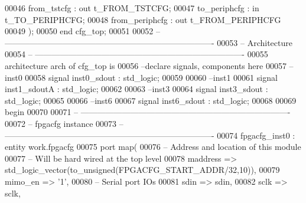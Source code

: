 \begin{DoxyCode}
00046       \textcolor{vhdlchar}{from_tstcfg}          \textcolor{vhdlchar}{:} \textcolor{keywordflow}{out} \textcolor{vhdlchar}{t_FROM_TSTCFG};
00047       \textcolor{vhdlchar}{to_periphcfg}         \textcolor{vhdlchar}{:} \textcolor{keywordflow}{in}  \textcolor{vhdlchar}{t_TO_PERIPHCFG};
00048       \textcolor{vhdlchar}{from_periphcfg}       \textcolor{vhdlchar}{:} \textcolor{keywordflow}{out} \textcolor{vhdlchar}{t_FROM_PERIPHCFG}
00049    \textcolor{vhdlchar}{)};
00050 \textcolor{keywordflow}{end} \textcolor{vhdlchar}{cfg\_top};
00051 
00052 \textcolor{keyword}{-- ----------------------------------------------------------------------------}
00053 \textcolor{keyword}{-- Architecture}
00054 \textcolor{keyword}{-- ----------------------------------------------------------------------------}
00055 \textcolor{keywordflow}{architecture} arch \textcolor{keywordflow}{of} cfg_top is
00056 \textcolor{keyword}{--declare signals,  components here}
00057 \textcolor{keyword}{--inst0 }
00058 \textcolor{keywordflow}{signal} \textcolor{vhdlchar}{inst0_sdout}   \textcolor{vhdlchar}{:} \textcolor{comment}{std\_logic};
00059 
00060 \textcolor{keyword}{--inst1}
00061 \textcolor{keywordflow}{signal} \textcolor{vhdlchar}{inst1_sdoutA}  \textcolor{vhdlchar}{:} \textcolor{comment}{std\_logic};
00062 
00063 \textcolor{keyword}{--inst3}
00064 \textcolor{keywordflow}{signal} \textcolor{vhdlchar}{inst3_sdout}   \textcolor{vhdlchar}{:} \textcolor{comment}{std\_logic};
00065 
00066 \textcolor{keyword}{--inst6}
00067 \textcolor{keywordflow}{signal} \textcolor{vhdlchar}{inst6_sdout}   \textcolor{vhdlchar}{:} \textcolor{comment}{std\_logic};
00068 
00069 \textcolor{vhdlkeyword}{begin}
00070 
00071 \textcolor{keyword}{-- ----------------------------------------------------------------------------}
00072 \textcolor{keyword}{-- fpgacfg instance}
00073 \textcolor{keyword}{-- ----------------------------------------------------------------------------     }
00074    fpgacfg\_inst0 : \textcolor{keywordflow}{entity} work.fpgacfg
00075    \textcolor{keywordflow}{port} \textcolor{keywordflow}{map}(
00076 \textcolor{keyword}{      -- Address and location of this module}
00077 \textcolor{keyword}{      -- Will be hard wired at the top level}
00078       maddress    => \textcolor{comment}{std\_logic\_vector}\textcolor{vhdlchar}{(}to\_unsigned\textcolor{vhdlchar}{(}FPGACFG\_START\_ADDR/32,\textcolor{vhdllogic}{10}\textcolor{vhdlchar}{)}\textcolor{vhdlchar}{)},
00079       mimo_en     => '1',   
00080 \textcolor{keyword}{      -- Serial port IOs}
00081       sdin        => sdin,
00082       sclk        => sclk,

\end{DoxyCode}
